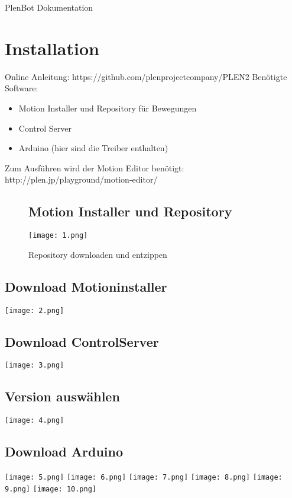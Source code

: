 \documentclass[11pt]{scrartcl}
\begin{document}
\begin{center}
 \huge {PlenBot Dokumentation}
 \end{center}

\section{Installation}
\label{sec: Installation}
Online Anleitung: https://github.com/plenprojectcompany/PLEN2
Benötigte Software:
\begin{itemize}
\item Motion Installer und Repository für Bewegungen
\item Control Server
\item Arduino (hier sind die Treiber enthalten)
\end{itemize}

\raggedright Zum Ausführen wird der Motion Editor benötigt: http://plen.jp/playground/motion-editor/

\newpage
\begin{figure}

\subsection{Motion Installer und Repository}
\label{subsec: Motion Installer und Repository}
\texttt{[image: 1.png]}

\caption{Repository downloaden und entzippen}
\end{figure}


\subsection{Download Motioninstaller}
\label{subsec: Download Motioninstaller}
\texttt{[image: 2.png]}


\subsection{Download ControlServer}
\label{subsec: Download ControlServer}
\texttt{[image: 3.png]}


\subsection{Version auswählen}
\label{subsec: Version auswählen}
\texttt{[image: 4.png]}


\subsection{Download Arduino}
\label{subsec: Download Arduino}
\texttt{[image: 5.png]}
\texttt{[image: 6.png]}
\texttt{[image: 7.png]}
\texttt{[image: 8.png]}
\texttt{[image: 9.png]}
\texttt{[image: 10.png]}
\end{document}
